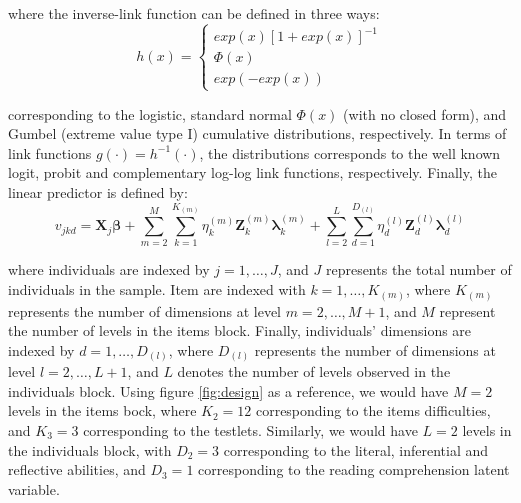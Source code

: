 \noindent where the inverse-link function can be defined in three ways:	
\begin{equation} \label{eq:response_dich1}
	h(x) = 
	\begin{cases}
		exp(x)[1 + exp(x)]^{-1} \\
		\Phi(x)  \\
		exp(-exp(x))
	\end{cases}
\end{equation}

\noindent corresponding to the logistic, standard normal $\Phi(x)$ (with no closed form), and Gumbel (extreme value type I) cumulative distributions, respectively. In terms of link functions $g(\cdot) = h^{-1}(\cdot)$, the distributions corresponds to the well known logit, probit and complementary log-log link functions, respectively. Finally, the linear predictor is defined by:
\begin{equation} \label{eq:linear_predictor}
	v_{jkd} = \mathbf{X}_{j} \pmb{\beta} + \sum_{m=2}^{M} \sum_{k=1}^{K_{(m)}} \eta_{k}^{(m)} \mathbf{Z}_{k}^{(m)} \pmb{\lambda}_{k}^{(m)} + \sum_{l=2}^{L} \sum_{d=1}^{D_{(l)}} \eta_{d}^{(l)} \mathbf{Z}_{d}^{(l)} \pmb{\lambda}_{d}^{(l)}
\end{equation}

\noindent where individuals are indexed by $j = 1, \dots, J$, and $J$ represents the total number of individuals in the sample. Item are indexed with $k= 1, \dots, K_{(m)}$, where $K_{(m)}$ represents the number of dimensions at level $m=2,\dots, M+1$, and $M$ represent the number of levels in the items block. Finally, individuals' dimensions are indexed by $d=1, \dots, D_{(l)}$, where $D_{(l)}$ represents the number of dimensions at level $l=2, \dots, L+1$, and $L$ denotes the number of levels observed in the individuals block. Using figure \ref{fig:design} as a reference, we would have $M=2$ levels in the items bock, where $K_{2}=12$ corresponding to the items difficulties, and $K_{3}=3$ corresponding to the testlets. Similarly, we would have $L=2$ levels in the individuals block, with $D_{2}=3$ corresponding to the literal, inferential and reflective abilities, and $D_{3}=1$ corresponding to the reading comprehension latent variable. 

